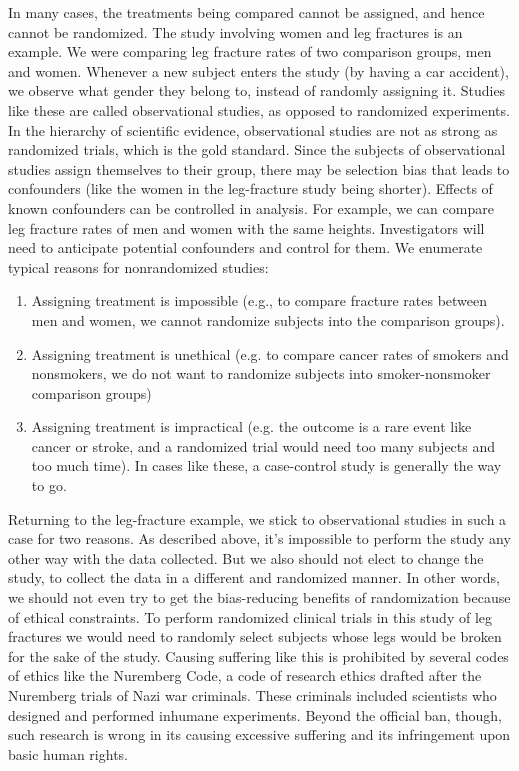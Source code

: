 \documentclass[11pt, chapterprefix=true]{scrbook}\usepackage[]{graphicx}\usepackage[]{color}
\begin{document}
In many cases, the treatments being compared cannot be assigned, and hence cannot be randomized.  The study involving women and leg fractures is an example.  We were comparing leg fracture rates of two comparison groups, men and women.  Whenever a new subject enters the study (by having a car accident), we observe what gender they belong to, instead of randomly assigning it.  Studies like these are called observational studies, as opposed to randomized experiments. In the hierarchy of scientific evidence, observational studies are not as strong as randomized trials, which is the gold standard. Since the subjects of observational studies assign themselves to their group, there may be selection bias that leads to confounders (like the women in the leg-fracture study being shorter).  Effects of known confounders can be controlled in analysis.  For example, we can compare leg fracture rates of men and women with the same heights. Investigators will need to anticipate potential confounders and control for them. We enumerate typical reasons for nonrandomized studies:

\begin{enumerate}
\item Assigning treatment is impossible (e.g., to compare fracture rates between men and women, we cannot randomize subjects into the comparison groups).

\item Assigning treatment is unethical (e.g. to compare cancer rates of smokers and nonsmokers, we do not want to randomize subjects into smoker-nonsmoker     comparison groups)

\item Assigning treatment is impractical (e.g. the outcome is a rare event like cancer or stroke, and a randomized trial would need too many subjects and too much time).  In cases like these, a case-control study is generally the way to go.
\end{enumerate}


Returning to the leg-fracture example, we stick to observational studies in such a case for two reasons. As described above, it's impossible to perform the study any other way with the data collected. But we also should not elect to change the study, to collect the data in a different and randomized manner.  In other words, we should not even try to get the bias-reducing benefits of randomization because of ethical constraints. To perform randomized clinical trials in this study of leg fractures we would need to randomly select subjects whose legs would be broken for the sake of the study. Causing suffering like this is prohibited by several codes of ethics like the Nuremberg Code, a code of research ethics drafted after the Nuremberg trials of Nazi war criminals.  These criminals included scientists who designed and performed inhumane experiments. Beyond the official ban, though, such research is wrong in its causing excessive suffering and its infringement upon basic human rights.
\end{document}
